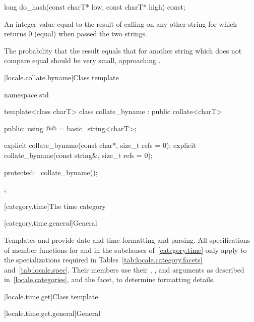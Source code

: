 %
\begin{itemdecl}
long do_hash(const charT* low, const charT* high) const;
\end{itemdecl}

\begin{itemdescr}
\pnum
\returns
An integer value equal to the result of calling 
on any other string for which  returns 0 (equal)
when passed the two strings.

\pnum
\recommended
The probability that the result equals that for another string
which does not compare equal should be very small,
approaching .
\end{itemdescr}

[locale.collate.byname]{Class template }

%
\begin{codeblock}
namespace std {
  template<class charT>
  class collate_byname : public collate<charT> {
  public:
    using @@ = basic_string<charT>;

    explicit collate_byname(const char*, size_t refs = 0);
    explicit collate_byname(const string&, size_t refs = 0);

  protected:
    ~collate_byname();
  };
}
\end{codeblock}

[category.time]{The time category}

[category.time.general]{General}

\pnum
Templates
 and
provide date and time formatting and parsing.
All specifications of member functions for  and 
in the subclauses of~\ref{category.time} only apply to the
specializations required in Tables~\ref{tab:locale.category.facets}
and~\ref{tab:locale.spec}.
Their members use their
, , and  arguments
as described in~\ref{locale.categories},
and the  facet,
to determine formatting details.

[locale.time.get]{Class template }

[locale.time.get.general]{General}

